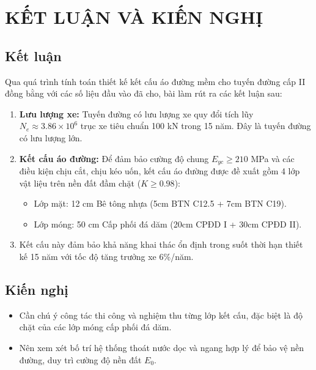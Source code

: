 \section{KẾT LUẬN VÀ KIẾN NGHỊ}

\subsection{Kết luận}
Qua quá trình tính toán thiết kế kết cấu áo đường mềm cho tuyến đường cấp II đồng bằng với các số liệu đầu vào đã cho, bài làm rút ra các kết luận sau:

\begin{enumerate}
    \item \textbf{Lưu lượng xe:} Tuyến đường có lưu lượng xe quy đổi tích lũy $N_e \approx 3.86 \times 10^6$ trục xe tiêu chuẩn 100 kN trong 15 năm. Đây là tuyến đường có lưu lượng lớn.
    \item \textbf{Kết cấu áo đường:} Để đảm bảo cường độ chung $E_{yc} \ge 210$ MPa và các điều kiện chịu cắt, chịu kéo uốn, kết cấu áo đường được đề xuất gồm 4 lớp vật liệu trên nền đất đầm chặt ($K \ge 0.98$):
    \begin{itemize}
        \item Lớp mặt: 12 cm Bê tông nhựa (5cm BTN C12.5 + 7cm BTN C19).
        \item Lớp móng: 50 cm Cấp phối đá dăm (20cm CPĐD I + 30cm CPĐD II).
    \end{itemize}
    \item Kết cấu này đảm bảo khả năng khai thác ổn định trong suốt thời hạn thiết kế 15 năm với tốc độ tăng trưởng xe 6\%/năm.
\end{enumerate}

\subsection{Kiến nghị}
\begin{itemize}
    \item Cần chú ý công tác thi công và nghiệm thu từng lớp kết cấu, đặc biệt là độ chặt của các lớp móng cấp phối đá dăm.
    \item Nên xem xét bố trí hệ thống thoát nước dọc và ngang hợp lý để bảo vệ nền đường, duy trì cường độ nền đất $E_0$.
\end{itemize}

